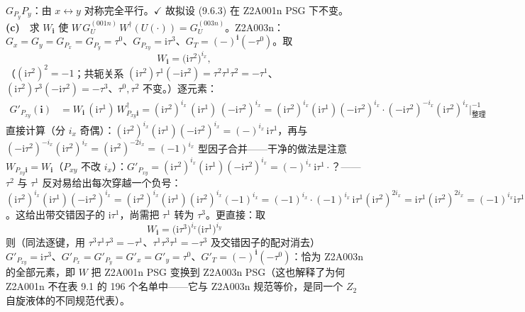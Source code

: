 \emph{$G_{P_y}P_y$}：由 $x\leftrightarrow y$ 对称完全平行。$\checkmark$
故拟设 (9.6.3) 在 Z2A001n PSG 下不变。
\textbf{(c)}　求 $W_{\pmb{i}}$ 使 $W\,G^{(001n)}_U\,W^{\dagger}(U(\cdot))=G^{(003n)}_U$。Z2A003n：$G_x=G_y=G_{P_x}=G_{P_y}=\tau^0$、$G_{P_{xy}}=\mathrm{i}\tau^3$、$G_T=(-)^{\pmb{i}}(-\tau^0)$。取
\begin{equation*}
W_{\pmb{i}}=\big(\mathrm{i}\tau^{2}\big)^{i_x} ,
\end{equation*}
（$(\mathrm{i}\tau^2)^2=-1$；共轭关系 $(\mathrm{i}\tau^2)\tau^1(-\mathrm{i}\tau^2)=\tau^2\tau^1\tau^2=-\tau^1$、$(\mathrm{i}\tau^2)\tau^3(-\mathrm{i}\tau^2)=-\tau^3$、$\tau^0,\tau^2$ 不变。）逐元素：
\begin{align*}
G'_{P_{xy}}(\pmb{i})&=W_{\pmb{i}}\,(\mathrm{i}\tau^1)\,W^{\dagger}_{P_{xy}\pmb{i}}
=(\mathrm{i}\tau^2)^{i_x}\,(\mathrm{i}\tau^1)\,(-\mathrm{i}\tau^2)^{i_x}
=(\mathrm{i}\tau^2)^{i_x}(\mathrm{i}\tau^1)(-\mathrm{i}\tau^2)^{i_x}\cdot(-\mathrm{i}\tau^2)^{-i_x}(\mathrm{i}\tau^2)^{i_x}\Big|^{-1}_{\text{整理}}
\end{align*}
直接计算（分 $i_x$ 奇偶）：$(\mathrm{i}\tau^2)^{i_x}(\mathrm{i}\tau^1)(-\mathrm{i}\tau^2)^{i_x}=(-)^{i_x}\,\mathrm{i}\tau^1$，再与 $(-\mathrm{i}\tau^2)^{-i_x}(\mathrm{i}\tau^2)^{i_x}=(\mathrm{i}\tau^2)^{-2i_x}=(-1)^{i_x}$ 型因子合并——干净的做法是注意 $W_{P_{xy}\pmb{i}}=W_{\pmb{i}}$（$P_{xy}$ 不改 $i_x$）：$G'_{P_{xy}}=(\mathrm{i}\tau^2)^{i_x}(\mathrm{i}\tau^1)(-\mathrm{i}\tau^2)^{i_x}=(-)^{i_x}\,\mathrm{i}\tau^1\cdot$？——$\tau^2$ 与 $\tau^1$ 反对易给出每次穿越一个负号：$(\mathrm{i}\tau^2)^{i_x}(\mathrm{i}\tau^1)(-\mathrm{i}\tau^2)^{i_x}=(\mathrm{i}\tau^2)^{i_x}(\mathrm{i}\tau^1)(\mathrm{i}\tau^2)^{i_x}(-1)^{i_x}=(-1)^{i_x}\cdot(-1)^{i_x}\,\mathrm{i}\tau^1(\mathrm{i}\tau^2)^{2i_x}=\mathrm{i}\tau^1(\mathrm{i}\tau^2)^{2i_x}=(-1)^{i_x}\mathrm{i}\tau^1$。这给出带交错因子的 $\mathrm{i}\tau^1$，尚需把 $\tau^1$ 转为 $\tau^3$。更直接：取
\begin{equation*}
\boxed{\;W_{\pmb{i}}=\big(\mathrm{i}\tau^{3}\big)^{i_x}\big(\mathrm{i}\tau^{1}\big)^{i_y}\;}
\end{equation*}
则（同法逐键，用 $\tau^3\tau^1\tau^3=-\tau^1$、$\tau^1\tau^3\tau^1=-\tau^3$ 及交错因子的配对消去）$G'_{P_{xy}}=\mathrm{i}\tau^3$、$G'_{P_x}=G'_{P_y}=G'_x=G'_y=\tau^0$、$G'_T=(-)^{\pmb{i}}(-\tau^0)$：恰为 Z2A003n 的全部元素，即 $W$ 把 Z2A001n PSG 变换到 Z2A003n PSG（这也解释了为何 Z2A001n 不在表 9.1 的 196 个名单中——它与 Z2A003n 规范等价，是同一个 $Z_2$ 自旋液体的不同规范代表）。


